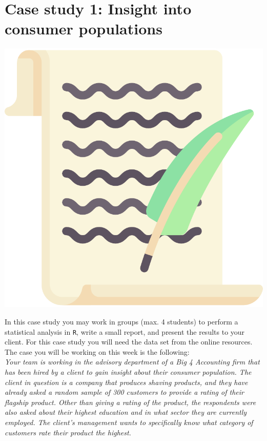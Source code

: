 
\begin{minipage}{0.8\textwidth}
\section{Case study 1: Insight into consumer populations}
\end{minipage}%
\hfill%
\begin{minipage}{0.1\textwidth}
\includegraphics[width=\linewidth]{Files/Images/lettericon.pdf}
\end{minipage}
\vspace*{.1cm}

In this case study you may work in groups (max. 4 students) to perform a statistical analysis in \texttt{R}, write a small report, and present the results to your client. For this case study you will need the data set  from the online resources. The case you will be working on this week is the following: \\

\textit{Your team is working in the advisory department of a Big 4 Accounting firm that has been hired by a client to gain insight about their consumer population. The client in question is a company that produces shaving products, and they have already asked a random sample of 300 customers to provide a rating of their flagship product. Other than giving a rating of the product, the respondents were also asked about their highest education and in what sector they are currently employed. The client's management wants to specifically know what category of customers rate their product the highest.} \\

